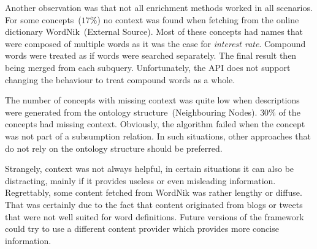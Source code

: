 Another observation was that not all enrichment methods worked in all scenarios.
For some concepts~($17\%$) no context was found when fetching from the online dictionary WordNik~(External Source). Most of these concepts had names that were composed of multiple words as it was the case for \emph{interest rate}. Compound words were treated as if words were searched separately. The final result then being merged from each subquery. Unfortunately, the API does not support changing the behaviour to treat compound words as a whole. 

The number of concepts with missing context was quite low when descriptions were generated from the ontology structure~(Neighbouring Nodes). $30\%$ of the concepts had missing context. Obviously, the algorithm failed when the concept was not part of a subsumption relation. In such situations, other approaches that do not rely on the ontology structure should be preferred. 

Strangely, context was not always helpful, in certain situations it can also be distracting, mainly if it provides useless or even misleading information. Regrettably, some content fetched from WordNik was rather lengthy or diffuse. That was certainly due to the fact that content originated from blogs or tweets that were not well suited for word definitions. Future versions of the framework could try to use a different content provider which provides more concise information.
